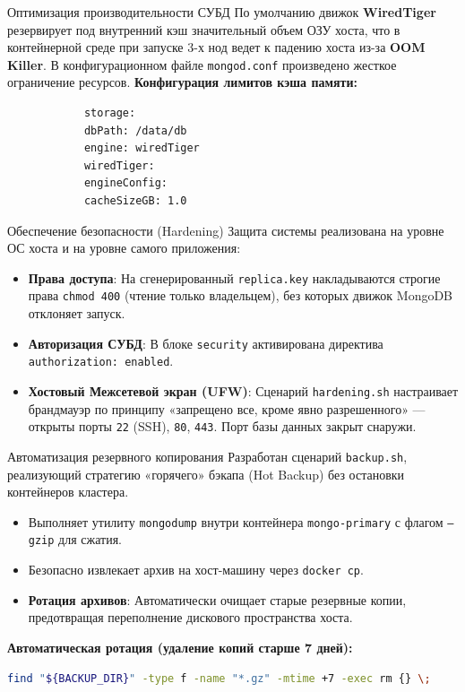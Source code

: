 \documentclass[10pt]{beamer}
\begin{document}
	\begin{frame}[fragile]{Оптимизация производительности СУБД}
		По умолчанию движок \textbf{WiredTiger} резервирует под внутренний кэш значительный объем ОЗУ хоста, что в контейнерной среде при запуске 3-х нод ведет к падению хоста из-за \textbf{OOM Killer}.
		\vfill
		В конфигурационном файле \texttt{mongod.conf} произведено жесткое ограничение ресурсов.
		\vfill
		\textbf{Конфигурация лимитов кэша памяти:}
		\vfill
		\begin{lstlisting}
			storage:
			dbPath: /data/db
			engine: wiredTiger
			wiredTiger:
			engineConfig:
			cacheSizeGB: 1.0
		\end{lstlisting}
	\end{frame}
	
	\begin{frame}{Обеспечение безопасности (Hardening)}
		Защита системы реализована на уровне ОС хоста и на уровне самого приложения:
		\vfill
		\begin{itemize}
			\item \textbf{Права доступа}: На сгенерированный \texttt{replica.key} накладываются строгие права \texttt{chmod 400} (чтение только владельцем), без которых движок MongoDB отклоняет запуск.
			\item \textbf{Авторизация СУБД}: В блоке \texttt{security} активирована директива \texttt{authorization: enabled}.
			\item \textbf{Хостовый Межсетевой экран (UFW)}: Сценарий \texttt{hardening.sh} настраивает брандмауэр по принципу «запрещено все, кроме явно разрешенного» — открыты порты \texttt{22} (SSH), \texttt{80}, \texttt{443}. Порт базы данных закрыт снаружи.
		\end{itemize}
	\end{frame}
	
	\begin{frame}[fragile]{Автоматизация резервного копирования}
		Разработан сценарий \texttt{backup.sh}, реализующий стратегию «горячего» бэкапа (Hot Backup) без остановки контейнеров кластера.
		\vfill
		\begin{itemize}
			\item Выполняет утилиту \texttt{mongodump} внутри контейнера \texttt{mongo-primary} с флагом \texttt{--gzip} для сжатия.
			\item Безопасно извлекает архив на хост-машину через \texttt{docker cp}.
			\item \textbf{Ротация архивов}: Автоматически очищает старые резервные копии, предотвращая переполнение дискового пространства хоста.
		\end{itemize}
		\vfill
		\textbf{Автоматическая ротация (удаление копий старше 7 дней):}
		\vfill
		\begin{lstlisting}[language=bash]
			find "${BACKUP_DIR}" -type f -name "*.gz" -mtime +7 -exec rm {} \;
		\end{lstlisting}
	\end{frame}
	
\end{document}

